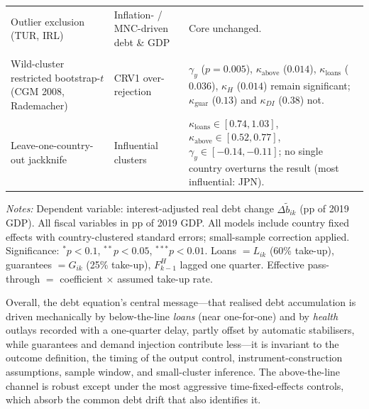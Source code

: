 \documentclass[12pt, a4paper]{article}
\begin{document}
\begin{table}[H]
\begin{tabular}{@{}p{} p{} p{}@{}}
Outlier exclusion (TUR, IRL) & Inflation- / MNC-driven debt \& GDP & Core unchanged. \\
\addlinespace
\multicolumn{3}{@{}l}{\textit{E.\ Small-cluster inference} ($N_{\text{cl}}=38$)}\\
Wild-cluster restricted bootstrap-$t$ (CGM 2008, Rademacher) & CRV1 over-rejection & $\gamma_y$ ($p=0.005$), $\kappa_{\text{above}}$ ($0.014$), $\kappa_{\text{loans}}$ ($0.036$), $\kappa_{H}$ ($0.014$) remain significant; $\kappa_{\text{guar}}$ ($0.13$) and $\kappa_{DI}$ ($0.38$) not. \\
Leave-one-country-out jackknife & Influential clusters & $\kappa_{\text{loans}}\in[0.74,1.03]$, $\kappa_{\text{above}}\in[0.52,0.77]$, $\gamma_y\in[-0.14,-0.11]$; no single country overturns the result (most influential: JPN). \\
\bottomrule
\end{tabular}
\vspace{4pt}
\parbox{\textwidth}{\scriptsize\textit{Notes:} Dependent variable: interest-adjusted real debt change $\Delta\tilde b_{ik}$
(pp of 2019 GDP). All fiscal variables in pp of 2019 GDP. All models include country fixed effects with
country-clustered standard errors; small-sample correction applied. Significance: $^{*}p<0.1$, $^{**}p<0.05$,
$^{***}p<0.01$. Loans $=L_{ik}$ (60\% take-up), guarantees $=G_{ik}$ (25\% take-up), $F^H_{k-1}$ lagged one
quarter. Effective pass-through $=$ coefficient $\times$ assumed take-up rate.}
\end{table}

Overall, the debt equation's central message---that realised debt accumulation
is driven mechanically by below-the-line \emph{loans} (near one-for-one) and by
\emph{health} outlays recorded with a one-quarter delay, partly offset by
automatic stabilisers, while guarantees and demand injection contribute less---it is invariant to the outcome definition, the timing of the output control, instrument-construction assumptions, sample window, and small-cluster inference. The above-the-line channel is robust except under the most aggressive time-fixed-effects controls, which absorb the common debt drift that also identifies it.


%
\end{document}
